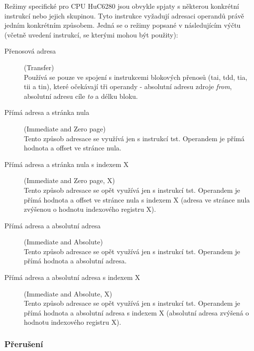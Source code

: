 Režimy specifické pro CPU HuC6280 jsou obvykle spjaty s některou konkrétní
instrukcí nebo jejich skupinou. Tyto instrukce vyžadují adresaci operandů právě
jedním konkrétním způsobem. Jedná se o režimy popsané v následujícím výčtu
(včetně uvedení instrukcí, se kterými mohou být použity):

\begin{description}
\item[Přenosová adresa] (Transfer) \\
	Používá se pouze ve spojení s instrukcemi blokových přenosů ({\sc tai},
	{\sc tdd}, {\sc tia}, {\sc tii} a {\sc tin}), které očekávají tři operandy
	- absolutní adresu zdroje {\it from}, absolutní adresu cíle {\it to} a
	délku bloku.\\

\item[Přímá adresa a stránka nula] (Immediate and Zero page) \\
	Tento způsob adresace se využívá jen s instrukcí {\sc tst}. Operandem je
	přímá hodnota a offset ve stránce nula. 

\item[Přímá adresa a stránka nula s indexem X] (Immediate and Zero page, X) \\
	Tento způsob adresace se opět využívá jen s instrukcí {\sc tst}. Operandem
	je přímá hodnota a offset ve stránce nula s indexem X (adresa ve stránce
	nula zvýšenou o hodnotu indexového registru {\sf X}). 

\item[Přímá adresa a absolutní adresa] (Immediate and Absolute) \\
	Tento způsob adresace se opět využívá jen s instrukcí {\sc tst}. Operandem
	je přímá hodnota a absolutní adresa. 

\item[Přímá adresa a absolutní adresa s indexem X] (Immediate and Absolute, X) \\
	Tento způsob adresace se opět využívá jen s instrukcí {\sc tst}. Operandem
	je přímá hodnota a absolutní adresa s indexem X (absolutní adresa zvýšená o
	hodnotu indexového registru {\sf X}). 
\end{description}


\subsubsection{Přerušení}\label{chap:spec_hw_cpu_irq}

